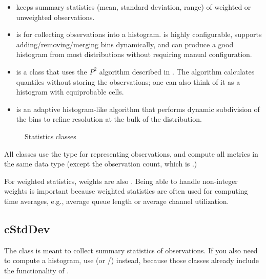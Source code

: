 \begin{itemize}
  \item {} keeps summary statistics (mean, standard deviation,
    range) of weighted or unweighted observations.
  \item {} is for collecting observations into a histogram.
     is highly configurable, supports adding/removing/merging bins
    dynamically, and can produce a good histogram from most distributions
    without requiring manual configuration.
  \item {} is a class that uses the $P^{2}$ algorithm
    described in \cite{JCh85}. The algorithm calculates quantiles without
    storing the observations; one can also think of it as a histogram
    with equiprobable cells.
  \item {} is an adaptive histogram-like algorithm
    that performs dynamic subdivision of the bins to refine resolution
    at the bulk of the distribution.
\end{itemize}

\begin{figure}[htbp]
  \begin{center}
    
    \caption{Statistics classes}
  \end{center}
\end{figure}

All classes use the  type for representing observations,
and compute all metrics in the same data type (except the observation
count, which is .)

For weighted statistics, weights are also . Being able to
handle non-integer weights is important because weighted statistics
are often used for computing time averages, e.g., average queue length
or average channel utilization.

\subsection{cStdDev}
\label{sec:sim-lib:cstatistic-and-descendants}

The  class is meant to collect summary statistics of
observations. If you also need to compute a histogram, use 
(or /) instead, because those classes
already include the functionality of .

